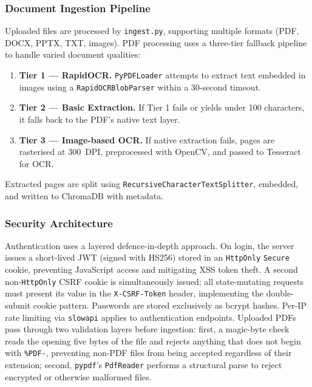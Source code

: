 \documentclass[11pt,a4paper]{article}
\begin{document}
\subsubsection{Document Ingestion Pipeline}

Uploaded files are processed by \texttt{ingest.py}, supporting multiple formats (PDF, DOCX, PPTX, TXT, images). PDF processing uses a three-tier fallback pipeline to handle varied document qualities:

\begin{enumerate}
    \item \textbf{Tier 1 --- RapidOCR.}  \texttt{PyPDFLoader} attempts to extract text embedded in images using a \texttt{RapidOCRBlobParser} within a 30-second timeout.
    \item \textbf{Tier 2 --- Basic Extraction.}  If Tier 1 fails or yields under 100 characters, it falls back to the PDF's native text layer.
    \item \textbf{Tier 3 --- Image-based OCR.}  If native extraction fails, pages are rasterised at 300~DPI, preprocessed with OpenCV, and passed to Tesseract for OCR.
\end{enumerate}

\noindent Extracted pages are split using \texttt{RecursiveCharacterTextSplitter}, embedded, and written to ChromaDB with metadata.

\subsubsection{Security Architecture}

Authentication uses a layered defence-in-depth approach.  On login, the server issues a
short-lived JWT (signed with HS256) stored in an \texttt{HttpOnly} \texttt{Secure} cookie,
preventing JavaScript access and mitigating XSS token theft.  A second non-\texttt{HttpOnly}
CSRF cookie is simultaneously issued; all state-mutating requests must present its value in
the \texttt{X-CSRF-Token} header, implementing the double-submit cookie pattern.  Passwords
are stored exclusively as bcrypt hashes.  Per-IP rate limiting via \texttt{slowapi} applies
to authentication endpoints.  Uploaded PDFs pass through two validation layers before
ingestion: first, a magic-byte check reads the opening five bytes of the file and rejects
anything that does not begin with \texttt{\%PDF-}, preventing non-PDF files from being
accepted regardless of their extension; second, \texttt{pypdf}'s \texttt{PdfReader} performs
a structural parse to reject encrypted or otherwise malformed files.
\end{document}
